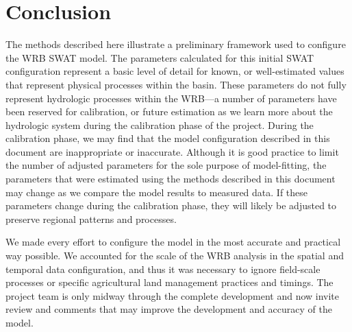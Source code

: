 \section{Conclusion}
The methods described here illustrate a preliminary framework used to configure the WRB SWAT model. The parameters calculated for this initial SWAT configuration represent a basic level of detail for known, or well-estimated values that represent physical processes within the basin. These parameters do not fully represent hydrologic processes within the WRB---a number of parameters have been reserved for calibration, or future estimation as we learn more about the hydrologic system during the calibration phase of the project. During the calibration phase, we may find that the model configuration described in this document are inappropriate or inaccurate. Although it is good practice to limit the number of adjusted parameters for the sole purpose of model-fitting, the parameters that were estimated using the methods described in this document may change as we compare the model results to measured data. If these parameters change during the calibration phase, they will likely be adjusted to preserve regional patterns and processes.

We made every effort to configure the model in the most accurate and practical way possible. We accounted for the scale of the WRB analysis in the spatial and temporal data configuration, and thus it was necessary to ignore field-scale processes or specific agricultural land management practices and timings. The project team is only midway through the complete development and now invite review and comments that may improve  the development and accuracy of the model. 



\pagebreak